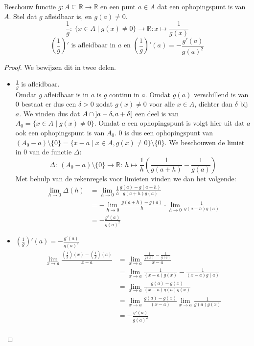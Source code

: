 \documentclass[main.tex]{subfiles}
\begin{document}
\begin{bpr}
  Beschouw functie $g: A \subseteq \mathbb{R} \rightarrow \mathbb{R}$ en een punt $a\in A$ dat een ophopingspunt is van $A$.
  Stel dat $g$ afleidbaar is, en $g(a) \neq 0$.
  \[ \frac{1}{g}:\ \{ x \in A \mid g(x) \neq 0\} \rightarrow \mathbb{R}: x \mapsto \frac{1}{g(x)} \]
  \[ \left(\frac{1}{g}\right)' \text{ is afleidbaar in } a \text{ en } \left(\frac{1}{g}\right)'(a) = -\frac{g'(a)}{g(a)^{2}} \]

  \begin{proof}
    We bewijzen dit in twee delen.
    \begin{itemize}
    \item $\frac{1}{g}$ is afleidbaar.\\
      Omdat $g$ afleidbaar is in $a$ is $g$ continu in $a$.
      Omdat $g(a)$ verschillend is van $0$ bestaat er dus een $\delta > 0$ zodat $g(x) \neq 0$ voor alle $x\in A$, dichter dan $\delta$ bij $a$.\waarom
      We vinden dus dat $A \cap \interval[open]{a-\delta}{a+\delta}$ een deel is van $A_{0} = \{ x \in A \mid g(x) \neq 0\}$.
      Omdat $a$ een ophopingspunt is volgt hier uit dat $a$ ook een ophopingspunt is van $A_{0}$.\waarom
      $0$ is dus een ophopingspunt van $(A_{0}-a) \setminus \{0\}= \{ x-a \mid x \in A, g(x) \neq 0\} \setminus \{0\}$.
      We beschouwen de limiet in $0$ van de functie $\Delta$:
      \[ \Delta:\ (A_{0}-a) \setminus \{0\} \rightarrow \mathbb{R}:\ h \mapsto \frac{1}{h}\left(\frac{1}{g(a+h)}-\frac{1}{g(a)} \right) \]
      Met behulp van de rekenregels voor limieten vinden we dan het volgende:
      \[
      \begin{array}{rl}
        \lim_{h \rightarrow 0}\Delta(h)
        &= \lim_{h \rightarrow 0}\frac{1}{h} \frac{g(a)-g(a+h)}{g(a+h)g(a)}\\
        &= -\lim_{h \rightarrow 0}\frac{g(a+h)-g(a)}{h} \cdot \lim_{h\rightarrow 0}\frac{1}{g(a+h)g(a)}\\
        &= -\frac{g'(a)}{g(a)^{2}}
      \end{array}
      \]
    \item $\left(\frac{1}{g}\right)'(a) = -\frac{g'(a)}{g(a)^{2}}$\\
      \[
      \begin{array}{rl}
        \lim_{x \rightarrow a}\frac{\left(\frac{1}{g}\right)(x)-\left(\frac{1}{g}\right)(a)}{x-a}
        &= \lim_{x \rightarrow a}\frac{\frac{1}{g(x)}-\frac{1}{g(a)} }{x-a}\\
        &= \lim_{x \rightarrow a}\frac{1}{(x-a)g(x)}-\frac{1}{(x-a)g(a)}\\
        &= \lim_{x \rightarrow a}\frac{g(a)-g(x)}{(x-a)g(a)g(x)}\\
        &= \lim_{x \rightarrow a}\frac{g(a)-g(x)}{(x-a)}\lim_{x\rightarrow a}\frac{1}{g(a)g(x)}\\
        &= -\frac{g'(a)}{g(a)^{2}}\\
      \end{array}
      \]
    \end{itemize}
  \end{proof}
\end{bpr}
\end{document}
